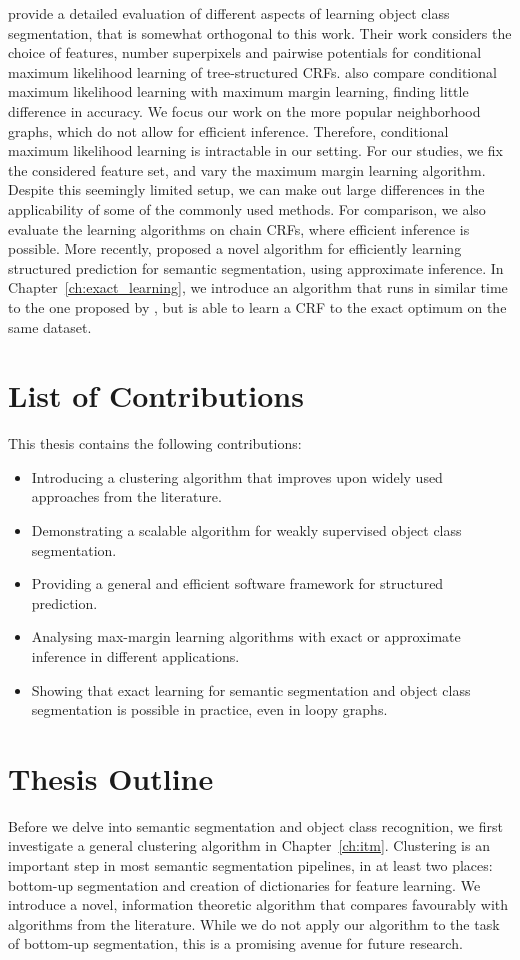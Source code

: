\citet{nowozin2010parameter} provide a detailed evaluation of different aspects of learning object class
segmentation, that is somewhat orthogonal to this work. Their work considers the choice of features,
number superpixels and pairwise potentials for conditional maximum likelihood learning of tree-structured CRFs.
\citet{nowozin2010parameter} also compare conditional maximum likelihood learning with maximum margin learning,
finding little difference in accuracy.
We focus our work on the more popular neighborhood graphs, which do not allow for efficient inference.
Therefore, conditional maximum likelihood learning is intractable in our setting. For our studies,
we fix the considered feature set, and vary the maximum margin learning algorithm. Despite
this seemingly limited setup, we can make out large differences in the applicability of
some of the commonly used methods. For comparison, we also evaluate the learning algorithms
on chain CRFs, where efficient inference is possible.
More recently, \citet{lucchi2013learning} proposed a novel algorithm for
efficiently learning structured prediction for semantic segmentation, using
approximate inference. In Chapter~\ref{ch:exact_learning}, we introduce an
algorithm that runs in similar time to the one proposed by
\citet{lucchi2013learning}, but is able to learn a CRF to the exact optimum on
the same dataset.


\section{List of Contributions}
This thesis contains the following contributions:
\begin{itemize}
\item Introducing a clustering algorithm that improves upon widely used
    approaches from the literature.
\item Demonstrating a scalable algorithm for weakly supervised object class segmentation.
\item Providing a general and efficient software framework for structured prediction.
\item Analysing  max-margin learning algorithms with exact or approximate inference in different applications.
\item Showing that exact learning for semantic segmentation and object class
    segmentation is possible in practice, even in loopy graphs.
\end{itemize}

\section{Thesis Outline}
Before we delve into semantic segmentation and object class recognition, we
first investigate a general clustering algorithm in Chapter~\ref{ch:itm}.
Clustering is an important step in most semantic segmentation pipelines, in at
least two places: bottom-up segmentation and creation of dictionaries for
feature learning. We introduce a novel, information theoretic algorithm that
compares favourably with algorithms from the literature.  While we do not apply
our algorithm to the task of bottom-up segmentation, this is a promising avenue
for future research.

